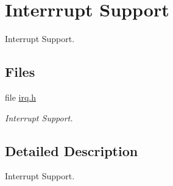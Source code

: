 \hypertarget{group__csb337__interrupt}{}\section{Interrrupt Support}
\label{group__csb337__interrupt}


Interrupt Support.  


\subsection*{Files}
\begin{DoxyCompactItemize}
\item 
file \mbox{\hyperlink{bsps_2arm_2csb337_2include_2bsp_2irq_8h}{irq.\+h}}
\begin{DoxyCompactList}\small\item\em Interrupt Support. \end{DoxyCompactList}\end{DoxyCompactItemize}


\subsection{Detailed Description}
Interrupt Support. 

